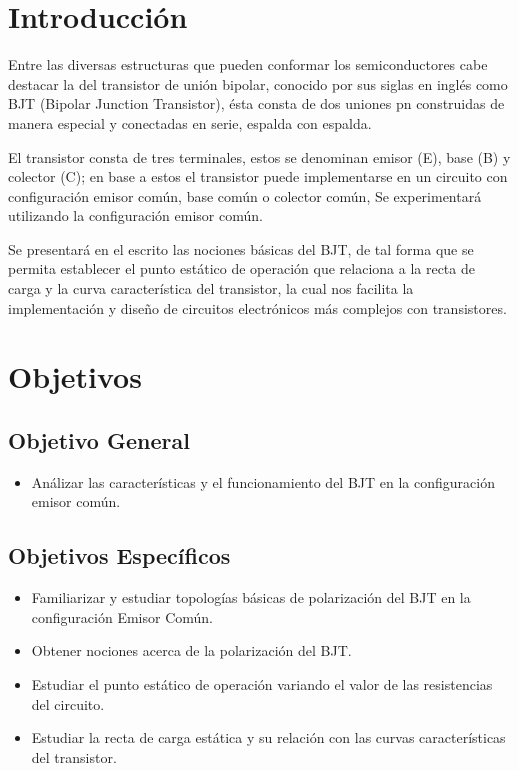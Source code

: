 \documentclass[10pt, a4paper]{article}
\begin{document}
    \section{Introducción}

    Entre las diversas estructuras que pueden conformar los semiconductores cabe destacar la del transistor de unión bipolar, conocido por sus siglas en inglés como BJT (Bipolar Junction Transistor), ésta consta de dos uniones pn construidas de manera especial y conectadas en serie, espalda con espalda.

    El transistor consta de tres terminales, estos se denominan emisor (E), base (B) y colector (C); en base a estos el transistor puede implementarse en un circuito con configuración emisor común, base común o colector común, Se experimentará utilizando la configuración emisor común.
    
    Se presentará en el escrito las nociones básicas del BJT, de tal forma que se permita establecer el punto estático de operación que relaciona a la recta de carga y la curva característica del transistor, la cual nos facilita la implementación y diseño de circuitos electrónicos más complejos con transistores.

    \newpage

    \section{Objetivos}

    \subsection{Objetivo General}
    \begin{itemize}
        \item Análizar las características y el funcionamiento del BJT en la configuración emisor común. 
    \end{itemize}

    \subsection{Objetivos Específicos}
    \begin{itemize}
        \item Familiarizar y estudiar topologías básicas de polarización del BJT en la configuración Emisor Común.
        \item Obtener nociones acerca de la polarización del BJT.
        \item Estudiar el punto estático de operación variando el valor de las resistencias del circuito.
        \item Estudiar la recta de carga estática y su relación con las curvas características del transistor.
    \end{itemize}
\end{document}
